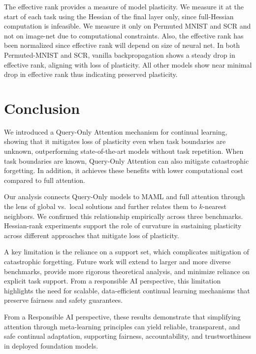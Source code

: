 \documentclass{article}
\begin{document}
The effective rank provides a measure of model plasticity.
We measure it at the start of each task using the Hessian of the final layer only, since full-Hessian computation is infeasible.
We measure it only on Permuted MNIST and SCR and not on image-net due to computational constraints. Also, the effective rank has been normalized since effective rank will depend on size of neural net. 
In both Permuted-MNIST and SCR, vanilla backpropagation shows a steady drop in effective rank, aligning with loss of plasticity. All other models show near minimal drop in effective rank thus indicating preserved plasticity.






\section{Conclusion}
\label{sec:conclusion}

We introduced a Query-Only Attention mechanism for continual learning, showing that it mitigates loss of plasticity even when task boundaries are unknown, outperforming state-of-the-art models without task repetition. When task boundaries are known, Query-Only Attention can also mitigate catastrophic forgetting. In addition, it achieves these benefits with lower computational cost compared to full attention.

Our analysis connects Query-Only models to MAML and full attention through the lens of global vs.\ local solutions and further relates them to $k$-nearest neighbors. We confirmed this relationship empirically across three benchmarks. Hessian-rank experiments support the role of curvature in sustaining plasticity across different approaches that mitigate loss of plasticity.

A key limitation is the reliance on a support set, which complicates mitigation of catastrophic forgetting. Future work will extend to larger and more diverse benchmarks, provide more rigorous theoretical analysis, and minimize reliance on explicit task support.
From a responsible AI perspective, this limitation highlights the need for scalable, data-efficient continual learning mechanisms that preserve fairness and safety guarantees.

From a Responsible AI perspective, these results demonstrate that simplifying attention through meta-learning principles can yield reliable, transparent, and safe continual adaptation, supporting fairness, accountability, and trustworthiness in deployed foundation models.
\end{document}
